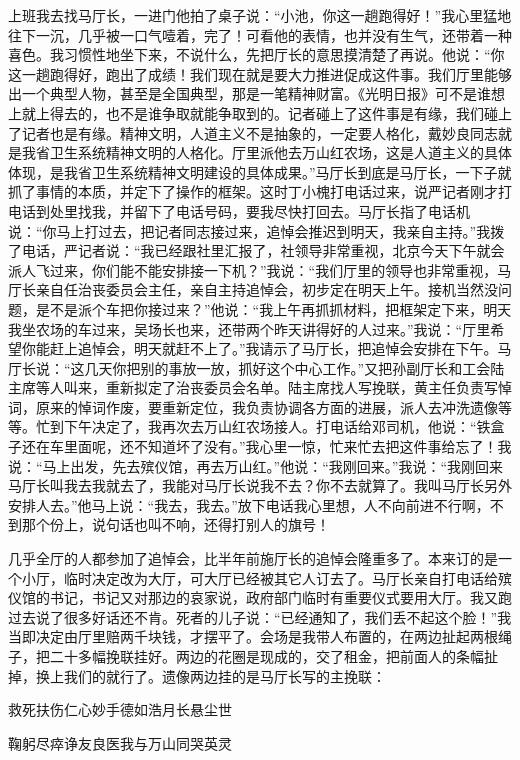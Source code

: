 \documentclass[12pt,oneside]{book}
\begin{document}
上班我去找马厅长，一进门他拍了桌子说：``小池，你这一趟跑得好！''我心里猛地往下一沉，几乎被一口气噎着，完了！可看他的表情，也并没有生气，还带着一种喜色。我习惯性地坐下来，不说什么，先把厅长的意思摸清楚了再说。他说：``你这一趟跑得好，跑出了成绩！我们现在就是要大力推进促成这件事。我们厅里能够出一个典型人物，甚至是全国典型，那是一笔精神财富。《光明日报》可不是谁想上就上得去的，也不是谁争取就能争取到的。记者碰上了这件事是有缘，我们碰上了记者也是有缘。精神文明，人道主义不是抽象的，一定要人格化，戴妙良同志就是我省卫生系统精神文明的人格化。厅里派他去万山红农场，这是人道主义的具体体现，是我省卫生系统精神文明建设的具体成果。''马厅长到底是马厅长，一下子就抓了事情的本质，并定下了操作的框架。这时丁小槐打电话过来，说严记者刚才打电话到处里找我，并留下了电话号码，要我尽快打回去。马厅长指了电话机说：``你马上打过去，把记者同志接过来，追悼会推迟到明天，我亲自主持。''我拨了电话，严记者说：``我已经跟社里汇报了，社领导非常重视，北京今天下午就会派人飞过来，你们能不能安排接一下机？''我说：``我们厅里的领导也非常重视，马厅长亲自任治丧委员会主任，亲自主持追悼会，初步定在明天上午。接机当然没问题，是不是派个车把你接过来？''他说：``我上午再抓抓材料，把框架定下来，明天我坐农场的车过来，吴场长也来，还带两个昨天讲得好的人过来。''我说：``厅里希望你能赶上追悼会，明天就赶不上了。''我请示了马厅长，把追悼会安排在下午。马厅长说：``这几天你把别的事放一放，抓好这个中心工作。''又把孙副厅长和工会陆主席等人叫来，重新拟定了治丧委员会名单。陆主席找人写挽联，黄主任负责写悼词，原来的悼词作废，要重新定位，我负责协调各方面的进展，派人去冲洗遗像等等。忙到下午决定了，我再次去万山红农场接人。打电话给邓司机，他说：``铁盒子还在车里面呢，还不知道坏了没有。''我心里一惊，忙来忙去把这件事给忘了！我说：``马上出发，先去殡仪馆，再去万山红。''他说：``我刚回来。''我说：``我刚回来马厅长叫我去我就去了，我能对马厅长说我不去？你不去就算了。我叫马厅长另外安排人去。''他马上说：``我去，我去。''放下电话我心里想，人不向前进不行啊，不到那个份上，说句话也叫不响，还得打别人的旗号！

几乎全厅的人都参加了追悼会，比半年前施厅长的追悼会隆重多了。本来订的是一个小厅，临时决定改为大厅，可大厅已经被其它人订去了。马厅长亲自打电话给殡仪馆的书记，书记又对那边的哀家说，政府部门临时有重要仪式要用大厅。我又跑过去说了很多好话还不肯。死者的儿子说：``已经通知了，我们丢不起这个脸！''我当即决定由厅里赔两千块钱，才摆平了。会场是我带人布置的，在两边扯起两根绳子，把二十多幅挽联挂好。两边的花圈是现成的，交了租金，把前面人的条幅扯掉，换上我们的就行了。遗像两边挂的是马厅长写的主挽联：

救死扶伤仁心妙手德如浩月长悬尘世

鞠躬尽瘁诤友良医我与万山同哭英灵
\end{document}
